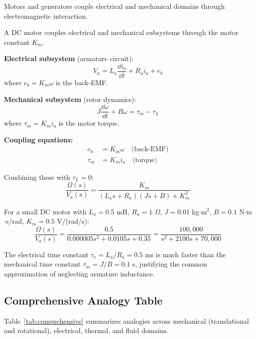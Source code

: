 Motors and generators couple electrical and mechanical domains through electromagnetic interaction.

\begin{examplebox}[title=Example 5.5: DC Motor Complete Model]
A DC motor couples electrical and mechanical subsystems through the motor constant $K_m$.

\textbf{Electrical subsystem} (armature circuit):
\begin{equation}
V_a = L_a \frac{\dd i_a}{\dd t} + R_a i_a + e_b
\end{equation}
where $e_b = K_m \omega$ is the back-EMF.

\textbf{Mechanical subsystem} (rotor dynamics):
\begin{equation}
J\frac{\dd \omega}{\dd t} + B\omega = \tau_m - \tau_L
\end{equation}
where $\tau_m = K_m i_a$ is the motor torque.

\textbf{Coupling equations:}
\begin{align}
e_b &= K_m \omega \quad \text{(back-EMF)} \\
\tau_m &= K_m i_a \quad \text{(torque)}
\end{align}

Combining these with $\tau_L = 0$:
\begin{equation}
\frac{\Omega(s)}{V_a(s)} = \frac{K_m}{(L_a s + R_a)(Js + B) + K_m^2}
\end{equation}

For a small DC motor with $L_a = 0.5$ mH, $R_a = 1$ $\Omega$, $J = 0.01$ kg$\cdot$m$^2$, $B = 0.1$ N$\cdot$m$\cdot$s/rad, $K_m = 0.5$ V/(rad/s):
\begin{equation}
\frac{\Omega(s)}{V_a(s)} = \frac{0.5}{0.000005s^2 + 0.0105s + 0.35} = \frac{100{,}000}{s^2 + 2100s + 70{,}000}
\end{equation}

The electrical time constant $\tau_e = L_a/R_a = 0.5$ ms is much faster than the mechanical time constant $\tau_m = J/B = 0.1$ s, justifying the common approximation of neglecting armature inductance.
\end{examplebox}

\subsection{Comprehensive Analogy Table}

Table~\ref{tab:comprehensive} summarizes analogies across mechanical (translational and rotational), electrical, thermal, and fluid domains.

